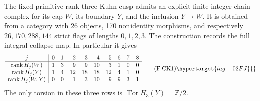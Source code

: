 \begin{theorem}\hypertarget{tag-02NP}{}\label{maps:src:F.2.34}


The fixed primitive rank-three Kuhn cusp admits an explicit
finite integer chain complex for its cap $W$, its boundary
$Y$, and the inclusion $Y\to W$.  It is obtained from a
category with 26 objects, 170 nonidentity morphisms, and
respectively $26,170,288,144$ strict flags of lengths
$0,1,2,3$.  The construction records the full integral
collapse map.  In particular it gives
\[
\begin{array}{c|rrrrrrrrr}
j&0&1&2&3&4&5&6&7&8\\\hline
\operatorname{rank}H_j(W)&1&3&9&9&10&3&1&0&0\\
\operatorname{rank}H_j(Y)&1&4&12&18&18&12&4&1&0\\
\operatorname{rank}H_j(W,Y)&0&0&1&3&10&9&9&3&1
\end{array}                                                \tag{F.CK1}\hypertarget{tag-02FJ}{}\label{maps:eq:F.CK1}
\]
The only torsion in these three rows is
$\operatorname{Tor}H_3(Y)=\mathbb Z/2$.

\end{theorem}
